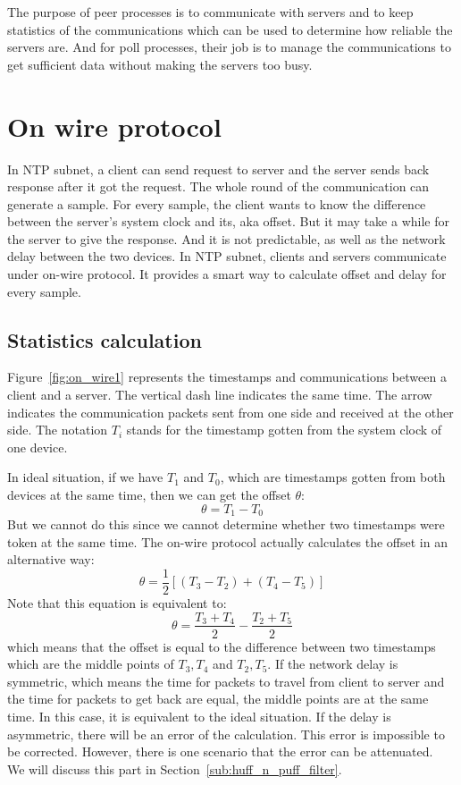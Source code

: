 

The purpose of peer processes is to communicate with servers and to keep
statistics of the communications which can be used to determine how reliable
the servers are. And for poll processes, their job is to manage the
communications to get sufficient data without making the servers too busy.

\section{On wire protocol}%
\label{sec:on_wire_protocol}
In NTP subnet, a client can send request to server and the server sends back
response after it got the request. The whole round of the communication can
generate a sample. For every sample, the client wants to know the difference
between the server's system clock and its, aka offset.
But it may take a while for the server to give the response. And it is not
predictable, as well as the network delay between the two devices.
In NTP subnet, clients and servers communicate under on-wire protocol. It
provides a smart way to calculate offset and delay for every sample. 

\subsection{Statistics calculation}%
\label{sub:statistics_calculation}
Figure~\ref{fig:on_wire1} represents the timestamps and communications between
a client and a server. The vertical dash line indicates the same time. The
arrow indicates the communication packets sent from one side and received at
the other side. The notation $T_i$ stands for the timestamp gotten from the
system clock of one device. 



In ideal situation, if we have $T_1$ and $T_0$, which are timestamps gotten
from both devices at the same time, then we can get the offset $\theta$:
$$\theta = T_1 - T_0$$
But we cannot do this since we cannot determine whether two timestamps were
token at the same time. The on-wire protocol actually calculates the offset in
an alternative way:
\begin{equation}
    \theta = \frac{1}{2}\left[(T_3 - T_2) + (T_4 - T_5)\right]
    \label{eq:offset_def}
\end{equation}
Note that this equation is equivalent to:
$$\theta = \frac{T_3 + T_4}{2} - \frac{T_2 + T_5}{2}$$
which means that the offset is equal to the difference between two timestamps
which are the middle points of $T_3, T_4$ and $T_2, T_5$. 
If the network delay is symmetric, which means the time for packets to travel
from client to server and the time for packets to get back are equal, the
middle points are at the same time. In this case, it is equivalent to the ideal
situation. If the delay is asymmetric, there will be an error of the
calculation. This error is impossible to be corrected. However, there is one
scenario that the error can be attenuated.~\cite{redbook} We will discuss this
part in Section~\ref{sub:huff_n_puff_filter}.

